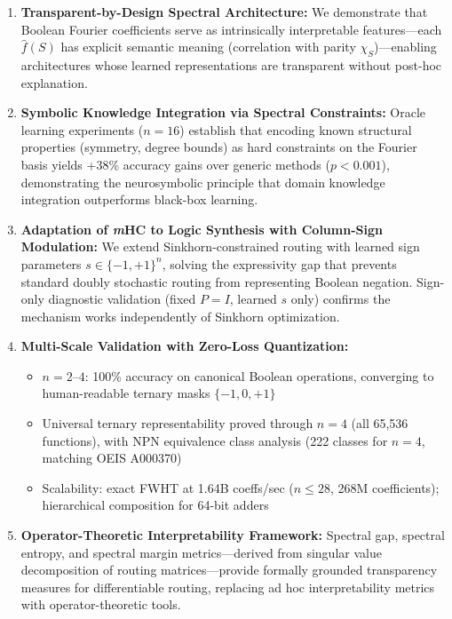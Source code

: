 \documentclass[Royal,times,sageh]{sagej}
\newcommand{\mHC}{\textit{m}HC}
\begin{document}
\begin{enumerate}
    \item \textbf{Transparent-by-Design Spectral Architecture:} We demonstrate that Boolean Fourier coefficients serve as intrinsically interpretable features---each $\hat{f}(S)$ has explicit semantic meaning (correlation with parity $\chi_S$)---enabling architectures whose learned representations are transparent without post-hoc explanation.

    \item \textbf{Symbolic Knowledge Integration via Spectral Constraints:} Oracle learning experiments ($n=16$) establish that encoding known structural properties (symmetry, degree bounds) as hard constraints on the Fourier basis yields +38\% accuracy gains over generic methods ($p < 0.001$), demonstrating the neurosymbolic principle that domain knowledge integration outperforms black-box learning.

    \item \textbf{Adaptation of \mHC{} to Logic Synthesis with Column-Sign Modulation:} We extend Sinkhorn-constrained routing with learned sign parameters $s \in \{-1, +1\}^n$, solving the expressivity gap that prevents standard doubly stochastic routing from representing Boolean negation. Sign-only diagnostic validation (fixed $P=I$, learned $s$ only) confirms the mechanism works independently of Sinkhorn optimization.

    \item \textbf{Multi-Scale Validation with Zero-Loss Quantization:}
    \begin{itemize}
        \item $n=2$--$4$: 100\% accuracy on canonical Boolean operations, converging to human-readable ternary masks $\{-1,0,+1\}$
        \item Universal ternary representability proved through $n=4$ (all 65,536 functions), with NPN equivalence class analysis (222 classes for $n=4$, matching OEIS A000370)
        \item Scalability: exact FWHT at 1.64B coeffs/sec ($n \leq 28$, 268M coefficients); hierarchical composition for 64-bit adders
    \end{itemize}

    \item \textbf{Operator-Theoretic Interpretability Framework:} Spectral gap, spectral entropy, and spectral margin metrics---derived from singular value decomposition of routing matrices---provide formally grounded transparency measures for differentiable routing, replacing ad hoc interpretability metrics with operator-theoretic tools.
\end{enumerate}
\end{document}
